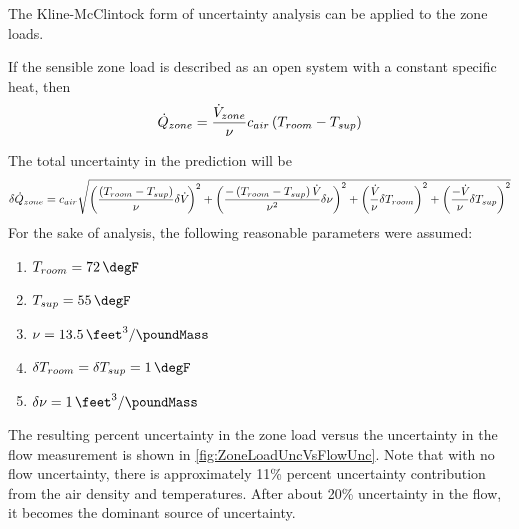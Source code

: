 The Kline-McClintock form of uncertainty analysis can be applied to the
zone loads.

If the sensible zone load is described as an open system with a constant specific
heat, then
\begin{equation}
    \dot{Q}_{zone} =  \frac{\dot{V}_{zone}}{\nu} c_{air} \left(T_{room} -
    T_{sup}\right)
\end{equation}

The total uncertainty in the prediction will be
\begin{equation}
    \delta \dot{Q}_{zone} = c_{air} \sqrt{ \left( \frac{\left(T_{room} - T_{sup}\right)}{\nu} \delta \dot{V}_{} \right)^2 
    + \left( \frac{- \left(T_{room} - T_{sup}\right) \dot{V}_{}}{\nu^{2}} \delta \nu \right)^{2}  
+ \left( \frac{\dot{V}_{}}{\nu} \delta T_{room}\right)^{2}
+ \left(\frac{-\dot{V}_{}}{\nu} \delta T_{sup}\right)^{2}
}
\end{equation}
For the sake of analysis, the following reasonable parameters were assumed:
\begin{enumerate}
    \item \(T_{room} = \SI{72}{\degF} \)
    \item \(T_{sup} = \SI{55}{\degF} \)
    \item \(\nu = \SI{13.5}{\feet\cubed\per\poundMass}\)
    \item \(\delta T_{room} = \delta T_{sup} = \SI{1}{\degF}\)
    \item \( \delta \nu = \SI{1}{\feet\cubed\per\poundMass} \)
\end{enumerate}

The resulting percent uncertainty in the zone load versus the
uncertainty in the flow measurement is shown in \figref{}
\ref{fig:ZoneLoadUncVsFlowUnc}. Note that with no flow
uncertainty, there is approximately 11\% percent uncertainty
contribution from the air density and temperatures. After about 20\%
uncertainty in the flow, it becomes the dominant source of uncertainty. 



